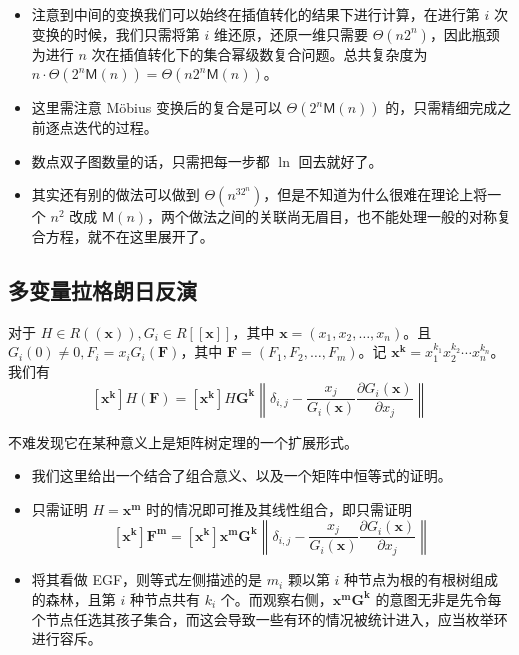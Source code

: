 \documentclass[mathserif]{ctexbeamer}
\newcommand{\Mul}{\mathsf{M}}
\begin{document}
\frame
{
  \begin{itemize}
  \item<1-> 注意到中间的变换我们可以始终在插值转化的结果下进行计算，在进行第 $i$ 次变换的时候，我们只需将第 $i$ 维还原，还原一维只需要 $\Theta(n2^n)$，因此瓶颈为进行 $n$ 次在插值转化下的集合幂级数复合问题。总共复杂度为 $n\cdot \Theta(2^n\Mul(n)) = \Theta(n2^n\Mul(n))$。
  \item<2-> 这里需注意 M\"obius 变换后的复合是可以 $\Theta(2^n\Mul(n))$ 的，只需精细完成之前逐点迭代的过程。
  \end{itemize}
}

\frame
{
  \begin{itemize}
  \item<1-> 数点双子图数量的话，只需把每一步都 $\ln$ 回去就好了。
  \item<2-> 其实还有别的做法可以做到 $\Theta(n^32^n)$，但是不知道为什么很难在理论上将一个 $n^2$ 改成 $\Mul(n)$，两个做法之间的关联尚无眉目，也不能处理一般的对称复合方程，就不在这里展开了。
  \end{itemize}
}

\subsection{多变量拉格朗日反演}

\frame
{
  \begin{theorem}[多变量拉格朗日反演]
  
  对于 $H \in R((\mathbf x)), G_i \in R[[\mathbf x]]$，其中 $\mathbf x = (x_1, x_2, \dots, x_n)$。且 $G_i(0) \neq 0, F_i = x_i G_i (\mathbf F)$，其中 $\mathbf F = (F_1, F_2, \dots, F_m)$。记 $\mathbf x^{\mathbf k} = x_1^{k_1} x_2^{k_2} \cdots x_n^{k_n}$。我们有
  $$
  [\mathbf x^{\mathbf k}]H(\mathbf F) = [\mathbf x^{\mathbf k}] H \mathbf G^{\mathbf k} \left \| 
  \delta_{i,j} - \frac{x_j}{G_i(\mathbf x)} \frac{\partial G_i (\mathbf x)}{\partial x_j}
  \right \|
  $$
  \end{theorem}
  
  不难发现它在某种意义上是矩阵树定理的一个扩展形式。
}

\frame
{
  \begin{itemize}
  \item<1->我们这里给出一个结合了组合意义、以及一个矩阵中恒等式的证明。
  
  \item<2->只需证明 $H = \mathbf {x^m}$ 时的情况即可推及其线性组合，即只需证明
$$
[\mathbf x^{\mathbf k}]\mathbf {F^m} = [\mathbf x^{\mathbf k}] \mathbf {x^m}\mathbf G^{\mathbf k} \left \| 
\delta_{i,j} - \frac{x_j}{G_i(\mathbf x)} \frac{\partial G_i (\mathbf x)}{\partial x_j}
\right \|
$$

  \item<3->将其看做 EGF，则等式左侧描述的是 $m_i$ 颗以第 $i$ 种节点为根的有根树组成的森林，且第 $i$ 种节点共有 $k_i$ 个。而观察右侧，$\mathbf {x^m}\mathbf G^{\mathbf k}$ 的意图无非是先令每个节点任选其孩子集合，而这会导致一些有环的情况被统计进入，应当枚举环进行容斥。
  \end{itemize}
}
\end{document}
